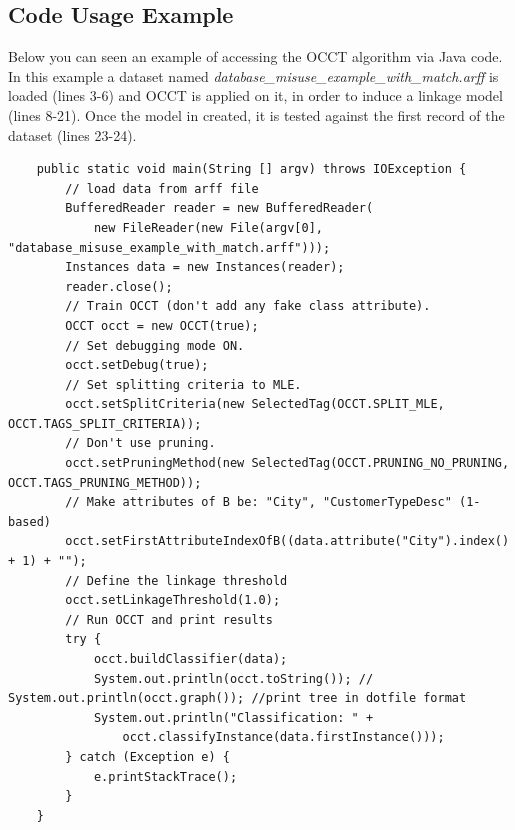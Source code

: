 \documentclass[a4paper,12pt]{article}
\begin{document}
\begin{spacing}{1.5}
\section{Code Usage Example}
Below you can seen an example of accessing the OCCT algorithm via Java code. In this example a dataset named {\em database\_misuse\_example\_with\_match.arff} is loaded (lines 3-6) and OCCT is applied on it, in order to induce a linkage model (lines 8-21). Once the model in created, it is tested against the first record of the dataset (lines 23-24).
\vspace{5mm}
\begin{lstlisting}
    public static void main(String [] argv) throws IOException {
        // load data from arff file
        BufferedReader reader = new BufferedReader(
            new FileReader(new File(argv[0], "database_misuse_example_with_match.arff")));
        Instances data = new Instances(reader);
        reader.close();
        // Train OCCT (don't add any fake class attribute).
        OCCT occt = new OCCT(true);
        // Set debugging mode ON.
        occt.setDebug(true);
        // Set splitting criteria to MLE.
        occt.setSplitCriteria(new SelectedTag(OCCT.SPLIT_MLE, OCCT.TAGS_SPLIT_CRITERIA));
        // Don't use pruning.
        occt.setPruningMethod(new SelectedTag(OCCT.PRUNING_NO_PRUNING, OCCT.TAGS_PRUNING_METHOD));
        // Make attributes of B be: "City", "CustomerTypeDesc" (1-based)
        occt.setFirstAttributeIndexOfB((data.attribute("City").index() + 1) + "");
        // Define the linkage threshold
        occt.setLinkageThreshold(1.0);
        // Run OCCT and print results
        try {
            occt.buildClassifier(data);
            System.out.println(occt.toString()); // System.out.println(occt.graph()); //print tree in dotfile format
            System.out.println("Classification: " +
                occt.classifyInstance(data.firstInstance()));
        } catch (Exception e) {
            e.printStackTrace();
        }
    }
\end{lstlisting}


\end{spacing}
\end{document}
